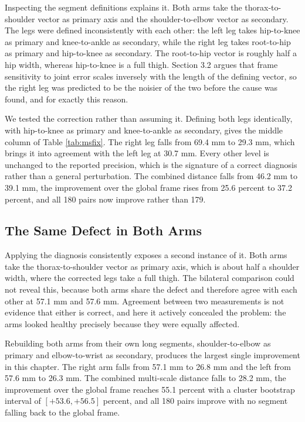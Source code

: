 Inspecting the segment definitions explains it. Both arms take the thorax-to-shoulder vector as primary axis and the shoulder-to-elbow vector as secondary. The legs were defined inconsistently with each other: the left leg takes hip-to-knee as primary and knee-to-ankle as secondary, while the right leg takes root-to-hip as primary and hip-to-knee as secondary. The root-to-hip vector is roughly half a hip width, whereas hip-to-knee is a full thigh. Section 3.2 argues that frame sensitivity to joint error scales inversely with the length of the defining vector, so the right leg was predicted to be the noisier of the two before the cause was found, and for exactly this reason.

We tested the correction rather than assuming it. Defining both legs identically, with hip-to-knee as primary and knee-to-ankle as secondary, gives the middle column of Table \ref{tab:msfix}. The right leg falls from 69.4 mm to 29.3 mm, which brings it into agreement with the left leg at 30.7 mm. Every other level is unchanged to the reported precision, which is the signature of a correct diagnosis rather than a general perturbation. The combined distance falls from 46.2 mm to 39.1 mm, the improvement over the global frame rises from 25.6 percent to 37.2 percent, and all 180 pairs now improve rather than 179.

\subsection{The Same Defect in Both Arms}

Applying the diagnosis consistently exposes a second instance of it. Both arms take the thorax-to-shoulder vector as primary axis, which is about half a shoulder width, where the corrected legs take a full thigh. The bilateral comparison could not reveal this, because both arms share the defect and therefore agree with each other at 57.1 mm and 57.6 mm. Agreement between two measurements is not evidence that either is correct, and here it actively concealed the problem: the arms looked healthy precisely because they were equally affected.

Rebuilding both arms from their own long segments, shoulder-to-elbow as primary and elbow-to-wrist as secondary, produces the largest single improvement in this chapter. The right arm falls from 57.1 mm to 26.8 mm and the left from 57.6 mm to 26.3 mm. The combined multi-scale distance falls to 28.2 mm, the improvement over the global frame reaches 55.1 percent with a cluster bootstrap interval of $[+53.6, +56.5]$ percent, and all 180 pairs improve with no segment falling back to the global frame.

